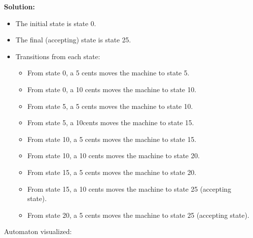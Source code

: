 \documentclass{article}
\theoremstyle{theorem}
\theoremstyle{definition}
\theoremstyle{remark}
\begin{document}
\textbf{Solution:}



\begin{itemize}
    \item The initial state is state 0.
    \item The final (accepting) state is state 25.
    \item Transitions from each state:
    \begin{itemize}
        \item From state 0, a 5 cents moves the machine to state 5.
        \item From state 0, a 10 cents moves the machine to state 10.
        \item From state 5, a 5 cents moves the machine to state 10.
        \item From state 5, a 10cents moves the machine to state 15.
        \item From state 10, a 5 cents moves the machine to state 15.
        \item From state 10, a 10 cents moves the machine to state 20.
        \item From state 15, a 5 cents moves the machine to state 20.
        \item From state 15, a 10 cents moves the machine to state 25 (accepting state).
        \item From state 20, a 5 cents moves the machine to state 25 (accepting state).
    \end{itemize}
\end{itemize}


Automaton visualized:

\end{document}
